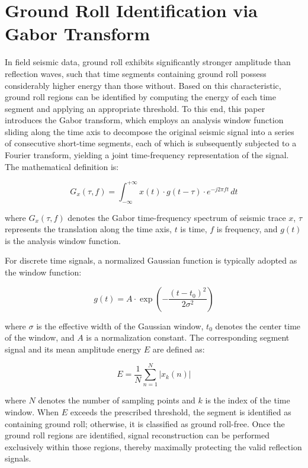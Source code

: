 \documentclass[a4paper,fleqn]{cas-dc}
\begin{document}
\section{Ground Roll Identification via Gabor Transform}
In field seismic data, ground roll exhibits significantly stronger amplitude than reflection 
waves, such that time segments containing ground roll possess considerably higher energy than 
those without. Based on this characteristic, ground roll regions can be identified by 
computing the energy of each time segment and applying an appropriate threshold. To this end, 
this paper introduces the Gabor transform, which employs an analysis window function sliding 
along the time axis to decompose the original seismic signal into a series of consecutive 
short-time segments, each of which is subsequently subjected to a Fourier transform, yielding 
a joint time-frequency representation of the signal. The mathematical definition is:

\begin{equation}
G_x(\tau, f) = \int_{-\infty}^{+\infty} x(t) \cdot g(t - \tau) \cdot e^{-j2\pi ft} \, dt
\end{equation}

where $G_x(\tau, f)$ denotes the Gabor time-frequency spectrum of seismic trace $x$, $\tau$ 
represents the translation along the time axis, $t$ is time, $f$ is frequency, and $g(t)$ 
is the analysis window function.

For discrete time signals, a normalized Gaussian function is typically adopted as the window 
function:

\begin{equation}
g(t) = A \cdot \exp\left(-\frac{(t - t_0)^2}{2\sigma^2}\right)
\end{equation}

where $\sigma$ is the effective width of the Gaussian window, $t_0$ denotes the center time 
of the window, and $A$ is a normalization constant. The corresponding segment signal and its 
mean amplitude energy $E$ are defined as:

\begin{equation}
E = \frac{1}{N} \sum_{n=1}^{N} \left| x_k(n) \right|
\end{equation}

where $N$ denotes the number of sampling points and $k$ is the index of the time window. 
When $E$ exceeds the prescribed threshold, the segment is identified as containing ground 
roll; otherwise, it is classified as ground roll-free. Once the ground roll regions are 
identified, signal reconstruction can be performed exclusively within those regions, thereby 
maximally protecting the valid reflection signals.
\end{document}
